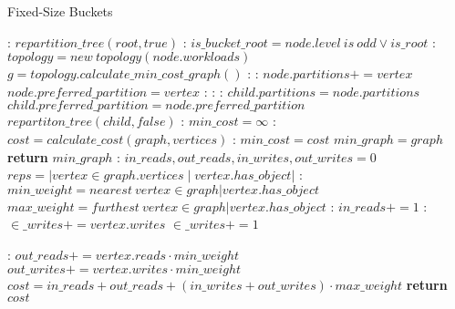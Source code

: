 \documentclass[mscthesis,12pt]{usiinfthesis}
\begin{document}
\begin{algorithm}
	\caption{Fixed-Size Buckets}\label{alg:fixed-size}
	\begin{algorithmic}[1]
	  :
	\State $repartition\_tree(root, true)$
	\EndFunction
	:
	\State $is\_bucket\_root = node.level\ is\ odd \vee is\_root$
	  :
		\State $topology = new\ topology(node.workloads)$
		\State $g = topology.calculate\_min\_cost\_graph()$
		:
		  :
		  \State $node.partitions += vertex$
			  \State $node.preferred\_partition = vertex$
			\EndIf
		  \EndIf
		\EndFor
	  \EndIf
	  :
		:
		:
		  \State $child.partitions = node.partitions$
		  \State $child.preferred\_partition = node.preferred\_partition$
		\EndIf
		  \State $repartiton\_tree(child, false)$
		  \EndFor
	  \EndIf
	  \EndFunction
	  :
	  \State $min\_cost = \infty$
		:
		  \State $cost = calculate\_cost(graph, vertices)$
		  :
			\State $min\_cost = cost$
			\State $min\_graph = graph$
		  \EndIf
		\EndFor
	  \State \textbf{return} $min\_graph$
	  \EndFunction
	  :
	  \State $in\_reads, out\_reads, in\_writes, out\_writes = 0$
	  \State $reps = |vertex \in graph.vertices \mid vertex.has\_object|$
	  :
	  \State $min\_weight = nearest\ vertex \in graph | vertex.has\_object$
	  \State $max\_weight = furthest\ vertex \in graph | vertex.has\_object$
	  :
	  \State $in\_reads+= 1$
	  :
	  \State $\in\_writes+= vertex.writes$
	  \Else
	  \State  $\in\_writes+= 1 $
	  \EndIf
	\end{algorithmic}
\end{algorithm}
\begin{algorithm}
	\begin{algorithmic}[1]
		  \Else:
			\State $out\_reads += vertex.reads \cdot min\_weight$
			\State $out\_writes += vertex.writes \cdot min\_weight$
		  \EndIf
		\EndFor
		\State $cost = in\_reads+ out\_reads + (in\_writes+ out\_writes) \cdot max\_weight$
		\State \textbf{return} $cost$
	\EndFunction
	\end{algorithmic}
\end{algorithm}
\end{document}
